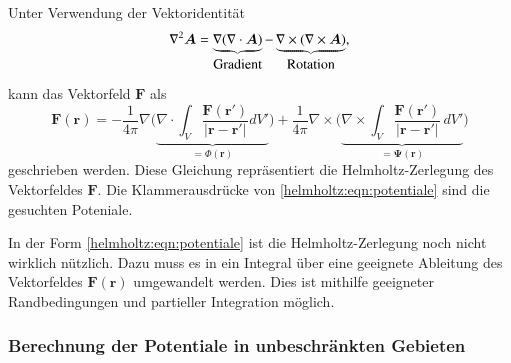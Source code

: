 
Unter Verwendung der Vektoridentität
\begin{equation}
\nabla^2 \boldsymbol{A}
=
\underbrace{
\nabla ( \nabla \cdot \boldsymbol{A} )
}_{
\textstyle\text{Gradient\strut}
}
-
\underbrace{
\nabla \times (\nabla \times \boldsymbol{A} )
}_{
\textstyle\text{Rotation\strut}
},
\end{equation}
kann das Vektorfeld $\boldsymbol{F}$ als
\begin{equation}
\boldsymbol{F}(\boldsymbol{r})
=
- \frac{1}{4 \pi} \nabla \biggl(
\underbrace{
\nabla \cdot \int_V
\frac{\boldsymbol{F}(\boldsymbol{r}')
}{
|\boldsymbol{r}
-
\boldsymbol{r}'|} dV'
}_{\displaystyle = \Phi(\boldsymbol{r})}
\biggr)
+
\frac{1}{4 \pi} \nabla \times \biggl(
\underbrace{
\nabla \times
\int_V
\frac{\boldsymbol{F}(\boldsymbol{r}')
}{
|\boldsymbol{r} - \boldsymbol{r}'|
}
\,dV'
}_{\displaystyle = \boldsymbol{\Psi}(\boldsymbol{r})}
\biggr)
\label{helmholtz:eqn:potentiale}
\end{equation}
geschrieben werden.
Diese Gleichung repräsentiert die Helmholtz-Zerlegung des Vektorfeldes
$\boldsymbol{F}$.
Die Klammerausdrücke von \eqref{helmholtz:eqn:potentiale}
sind die gesuchten Poteniale.

In der Form \eqref{helmholtz:eqn:potentiale} ist die Helmholtz-Zerlegung
noch nicht wirklich nützlich.
Dazu muss es in ein Integral über eine geeignete Ableitung des
Vektorfeldes $\boldsymbol{F}(\boldsymbol{r})$ umgewandelt werden.
Dies ist mithilfe geeigneter Randbedingungen und partieller Integration
möglich.

\subsubsection{Berechnung der Potentiale in unbeschränkten Gebieten}

